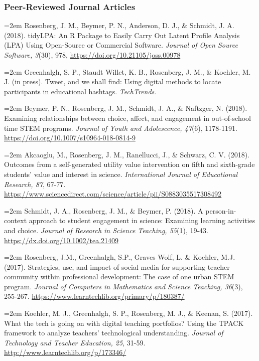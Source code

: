 \documentclass[]{article}
\begin{document}
\hypertarget{peer-reviewed-journal-articles}{%
\subsubsection{Peer-Reviewed Journal
Articles}\label{peer-reviewed-journal-articles}}

\hangindent=2em Rosenberg, J. M., Beymer, P. N., Anderson, D. J., \&
Schmidt, J. A. (2018). tidyLPA: An R Package to Easily Carry Out Latent
Profile Analysis (LPA) Using Open-Source or Commercial Software.
\emph{Journal of Open Source Software, 3}(30), 978,
\url{https://doi.org/10.21105/joss.00978}

\hangindent=2em Greenhalgh, S. P., Staudt Willet, K. B., Rosenberg, J.
M., \& Koehler, M. J. (in press). Tweet, and we shall find: Using
digital methods to locate participants in educational hashtags.
\emph{TechTrends}.

\hangindent=2em Beymer, P. N., Rosenberg, J. M., Schmidt, J. A., \&
Naftzger, N. (2018). Examining relationships between choice, affect, and
engagement in out-of-school time STEM programs. \emph{Journal of Youth
and Adolescence, 47}(6), 1178-1191.
\url{https://doi.org/10.1007/s10964-018-0814-9}

\hangindent=2em Akcaoglu, M., Rosenberg, J. M., Ranellucci, J., \&
Schwarz, C. V. (2018). Outcomes from a self-generated utility value
intervention on fifth and sixth-grade students' value and interest in
science. \emph{International Journal of Educational Research, 87},
67-77.
\url{https://www.sciencedirect.com/science/article/pii/S0883035517308492}

\hangindent=2em Schmidt, J. A., Rosenberg, J. M., \& Beymer, P. (2018).
A person-in-context approach to student engagement in science: Examining
learning activities and choice. \emph{Journal of Research in Science
Teaching, 55}(1), 19-43. \url{https://dx.doi.org/10.1002/tea.21409}

\hangindent=2em Rosenberg, J.M., Greenhalgh, S.P., Graves Wolf, L. \&
Koehler, M.J. (2017). Strategies, use, and impact of social media for
supporting teacher community within professional development: The case
of one urban STEM program. \emph{Journal of Computers in Mathematics and
Science Teaching, 36}(3), 255-267.
\url{https://www.learntechlib.org/primary/p/180387/}

\hangindent=2em Koehler, M. J., Greenhalgh, S. P., Rosenberg, M. J., \&
Keenan, S. (2017). What the tech is going on with digital teaching
portfolios? Using the TPACK framework to analyze teachers' technological
understanding. \emph{Journal of Technology and Teacher Education, 25},
31-59. \url{http://www.learntechlib.org/p/173346/}
\end{document}

